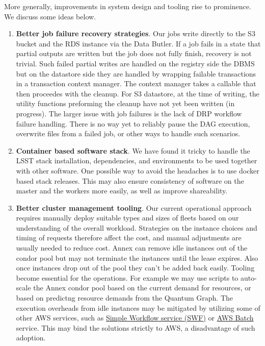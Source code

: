 More generally, improvements in system design and tooling rise to prominence.
We discuss some ideas below.

\begin{enumerate}
\item \textbf{Better job failure recovery strategies}.
Our jobs write directly to the S3 bucket and the RDS instance via the Data Butler.
If a job fails in a state that partial outputs are written but the job does not fully finish, recovery is not trivial. Such failed partial writes are handled on the registry side the DBMS but on the datastore side they are handled by wrapping failable transactions in a transaction context manager. The context manager takes a callable that then proceedes with the cleanup. For S3 datastore, at the time of writing, the utility functions preforming the cleanup have not yet been written (in progress). The larger issue with job failures is the lack of DRP workflow failure handling. There is no way yet to reliably pause the DAG execution, overwrite files from a failed job, or other ways to handle such scenarios.
\item \textbf{Container based software stack}.
We have found it tricky to handle the LSST stack installation, dependencies, and environments to be used together with other software. One possible way to avoid the headaches is to use docker based stack releases. This may also ensure consistency of software on the master and the workers more easily, as well as improve shareability.
\item \textbf{Better cluster management tooling}.
Our current operational approach requires manually deploy suitable types and sizes of fleets based on our understanding of the overall workload.
Strategies on the instance choices and timing of requests therefore affect the cost, and manual adjustments are usually needed to reduce cost.
Annex can remove idle instances out of the condor pool but may not terminate the instances until the lease expires.
Also once instances drop out of the pool they can't be added back easily.
Tooling become essential for the operations.
For example we may use scripts to auto-scale the Annex condor pool based on the current demand for resources, or based on predictng resource demands from the Quantum Graph.
The execution overheads from idle instances may be mitigated by utilizing some of other AWS services, such as \href{https://aws.amazon.com/swf/}{Simple Workflow service (SWF)} or \href{https://aws.amazon.com/batch/}{AWS Batch} service.
This may bind the solutions strictly to AWS, a disadvantage of such adoption.

\end{enumerate}
